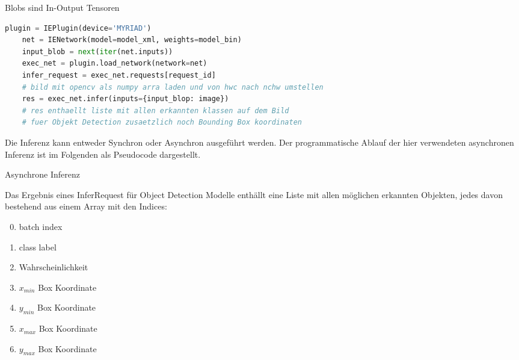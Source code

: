 \begin{figure}[htb]
    \centering
        
    \label{fig:diagramm}
\end{figure}


Blobs sind In-Output Tensoren


\begin{lstlisting}[language=Python]
    plugin = IEPlugin(device='MYRIAD')
    net = IENetwork(model=model_xml, weights=model_bin)
    input_blob = next(iter(net.inputs))
    exec_net = plugin.load_network(network=net)
    infer_request = exec_net.requests[request_id]
    # bild mit opencv als numpy arra laden und von hwc nach nchw umstellen
    res = exec_net.infer(inputs={input_blop: image})
    # res enthaellt liste mit allen erkannten klassen auf dem Bild
    # fuer Objekt Detection zusaetzlich noch Bounding Box koordinaten
\end{lstlisting}


Die Inferenz kann entweder Synchron oder Asynchron ausgeführt 
werden. Der programmatische Ablauf der hier verwendeten 
asynchronen Inferenz ist im Folgenden als Pseudocode dargestellt.



\begin{algorithm}[H]
    \caption{Asynchrone Inferenz}
\end{algorithm}


Das Ergebnis eines InferRequest für Object Detection Modelle 
enthällt eine Liste mit allen möglichen erkannten Objekten, jedes 
davon bestehend aus einem Array mit den Indices:

\begin{enumerate}
    \setcounter{enumi}{-1}
    \item batch index
    \item class label
    \item Wahrscheinlichkeit
    \item $x_{min}$ Box Koordinate
    \item $y_{min}$ Box Koordinate
    \item $x_{max}$ Box Koordinate
    \item $y_{max}$ Box Koordinate
\end{enumerate}

